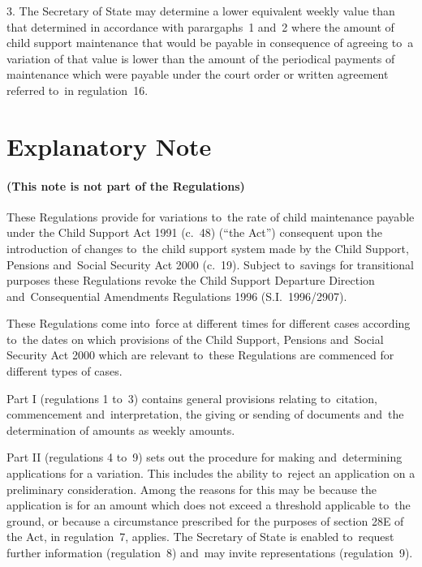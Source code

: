 \documentclass[12pt,a4paper]{article}
\begin{document}
\medskip

3.  The Secretary of State may determine a lower equivalent weekly value than that determined in accordance with parargaphs~1 and~2 where the amount of child support maintenance that would be payable in consequence of agreeing to~a variation of that value is lower than the amount of the periodical payments of maintenance which were payable under the court order or written agreement referred to~in regulation~16. 

\part{Explanatory Note}

\renewcommand\parthead{— Explanatory Note}

\subsection*{(This note is not part of the Regulations)}

These Regulations provide for variations to~the rate of child maintenance payable under the Child Support Act 1991 (c.\ 48) (“the Act”) consequent upon the introduction of changes to~the child support system made by the Child Support, Pensions and~Social Security Act 2000 (c.\ 19). Subject to~savings for transitional purposes these Regulations revoke the Child Support Departure Direction and~Consequential Amendments Regulations 1996 (S.I.\ 1996/2907).

These Regulations come into~force at different times for different cases according to~the dates on which provisions of the Child Support, Pensions and~Social Security Act 2000 which are relevant to~these Regulations are commenced for different types of cases.

Part I (regulations 1 to~3) contains general provisions relating to~citation, commencement and~interpretation, the giving or sending of documents and~the determination of amounts as weekly amounts.

Part II (regulations 4 to~9) sets out the procedure for making and~determining applications for a variation. This includes the ability to~reject an application on a preliminary consideration. Among the reasons for this may be because the application is for an amount which does not exceed a threshold applicable to~the ground, or because a circumstance prescribed for the purposes of section 28E of the Act, in regulation~7, applies. The Secretary of State is enabled to~request further information (regulation~8) and~may invite representations (regulation~9).
\end{document}
